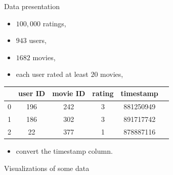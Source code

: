 \documentclass[unknownkeysallowed]{beamer}
\begin{document}
\begin{frame}{Data presentation}
\begin{itemize}
    \item $100,000$ ratings,
    \item $943$ users,
    \item $1682$ movies,
    \item each user rated at least $20$ movies,
\end{itemize}
\begin{center}
    \begin{tabular}{|c|c|c|c|c|c|}
    \hline
         & user ID & movie ID & rating & timestamp \\
         \hline \hline
         0 & 196 & 242 & 3 & 881250949\\
         1 & 186 & 302 & 3 & 891717742\\
         2 & 22 & 377 & 1 & 878887116\\
         \hline
    \end{tabular}
\end{center}
\begin{itemize}
    \item convert the timestamp column.
\end{itemize}
\end{frame}

\begin{frame}[plain]{}
    \begin{center}
        \color{marron}
        \LARGE Visualizations of some data
    \end{center}
\end{frame}
\end{document}
